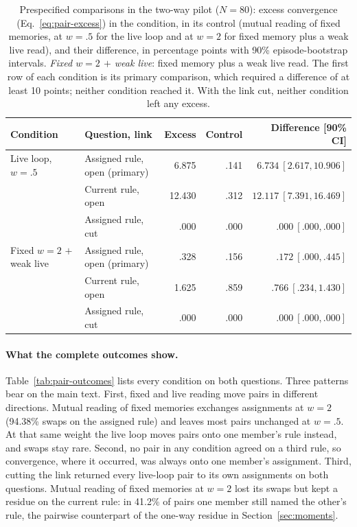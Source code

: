 \begin{table}[htbp]
\centering\small
\caption{Prespecified comparisons in the two-way pilot ($N=80$):
excess convergence (Eq.~\ref{eq:pair-excess}) in the condition, in
its control (mutual reading of fixed memories, at $w=.5$ for the live
loop and at $w=2$ for fixed memory plus a weak live read), and their
difference, in percentage points with 90\% episode-bootstrap intervals.
\emph{Fixed $w=2$ $+$ weak live}: fixed memory plus a weak live read.
The first row of each condition is its primary comparison, which
required a difference of at least 10 points; neither condition reached
it. With the link cut, neither condition left any excess.}
\label{tab:pair-gate}
\begin{tabularx}{\linewidth}{@{}Ylrrr@{}}
\toprule
Condition & Question, link & Excess & Control & Difference [90\% CI] \\
\midrule
Live loop, $w=.5$ & Assigned rule, open (primary) & 6.875 & .141 & $6.734\ [2.617,10.906]$ \\
 & Current rule, open & 12.430 & .312 & $12.117\ [7.391,16.469]$ \\
 & Assigned rule, cut & .000 & .000 & $.000\ [.000,.000]$ \\
\addlinespace
Fixed $w=2$ $+$ weak live & Assigned rule, open (primary) & .328 & .156 & $.172\ [.000,.445]$ \\
 & Current rule, open & 1.625 & .859 & $.766\ [.234,1.430]$ \\
 & Assigned rule, cut & .000 & .000 & $.000\ [.000,.000]$ \\
\bottomrule
\end{tabularx}
\end{table}

\paragraph{What the complete outcomes show.}
Table~\ref{tab:pair-outcomes} lists every condition on both questions.
Three patterns bear on the main text. First, fixed and live reading move
pairs in different directions. Mutual reading of fixed memories
exchanges assignments at $w=2$ (94.38\% swaps on the assigned rule)
and leaves most pairs unchanged at $w=.5$. At that same weight the live
loop moves pairs onto one member's rule instead, and swaps stay
rare. Second, no pair in any condition agreed on a third rule, so
convergence, where it occurred, was always onto one member's
assignment. Third, cutting the link returned every live-loop pair to its
own assignments on both questions. Mutual reading of fixed memories at
$w=2$ lost its swaps but kept a residue on the current rule: in
41.2\% of pairs one member still named the other's rule, the
pairwise counterpart of the one-way residue in
Section~\ref{sec:moments}.


